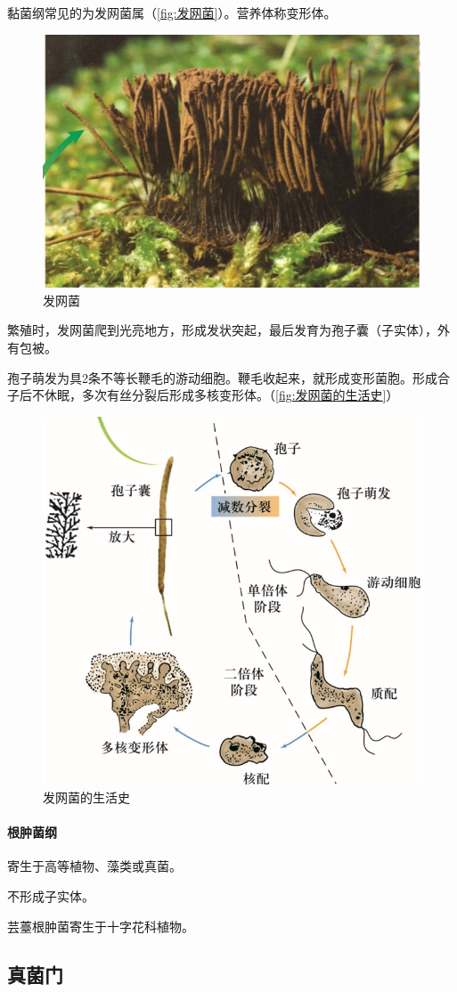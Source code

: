黏菌纲常见的为发网菌属（\autoref{fig:发网菌}）。营养体称变形体。

\begin{figure}[htbp]
	\centering
	\includegraphics[width=0.5\linewidth]{Pics/发网菌}
	\caption{发网菌}
	\label{fig:发网菌}
\end{figure}


繁殖时，发网菌爬到光亮地方，形成发状突起，最后发育为孢子囊（子实体），外有包被。

孢子萌发为具2条不等长鞭毛的游动细胞。鞭毛收起来，就形成变形菌胞。形成合子后不休眠，多次有丝分裂后形成多核变形体。（\autoref{fig:发网菌的生活史}）

\begin{figure}[htbp]
	\centering
	\includegraphics[width=0.6\linewidth]{Pics/发网菌的生活史}
	\caption{发网菌的生活史}
	\label{fig:发网菌的生活史}
\end{figure}

\paragraph{根肿菌纲}

寄生于高等植物、藻类或真菌。

不形成子实体。

芸薹根肿菌寄生于十字花科植物。

\subsection{真菌门}

